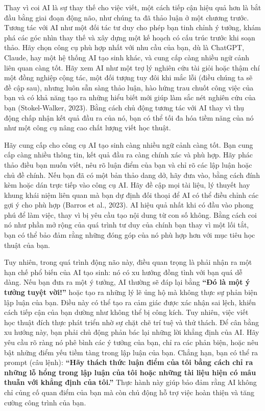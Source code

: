 Thay vì coi AI là sự thay thế cho việc viết, một cách tiếp cận hiệu quả hơn là bắt đầu bằng giai đoạn động não, như chúng ta đã thảo luận ở một chương trước. Tương tác với AI như một đối tác tư duy cho phép bạn tinh chỉnh ý tưởng, khám phá các góc nhìn thay thế và xây dựng một kế hoạch có cấu trúc trước khi soạn thảo. Hãy chọn công cụ phù hợp nhất với nhu cầu của bạn, dù là ChatGPT, Claude, hay một hệ thống AI tạo sinh khác, và cung cấp càng nhiều ngữ cảnh liên quan càng tốt. Hãy xem AI như một trợ lý nghiên cứu tài giỏi hoặc thậm chí một đồng nghiệp cộng tác, một đối tượng tuy đôi khi mắc lỗi (điều chúng ta sẽ đề cập sau), nhưng luôn sẵn sàng thảo luận, hào hứng trau chuốt công việc của bạn và có khả năng tạo ra những hiểu biết mới giúp làm sắc nét nghiên cứu của bạn (Stokel-Walker, 2023). Bằng cách chủ động tương tác với AI thay vì thụ động chấp nhận kết quả đầu ra của nó, bạn có thể tối đa hóa tiềm năng của nó như một công cụ nâng cao chất lượng viết học thuật.

Hãy cung cấp cho công cụ AI tạo sinh càng nhiều ngữ cảnh càng tốt. Bạn cung cấp càng nhiều thông tin, kết quả đầu ra càng chính xác và phù hợp. Hãy phác thảo điều bạn muốn viết, nêu rõ luận điểm của bạn và chỉ rõ các lập luận hoặc chủ đề chính. Nếu bạn đã có một bản thảo dang dở, hãy đưa vào, bằng cách đính kèm hoặc dán trực tiếp vào công cụ AI. Hãy đề cập mọi tài liệu, lý thuyết hay khung khái niệm liên quan mà bạn dự định đối thoại để AI có thể điều chỉnh các gợi ý cho phù hợp (Barros et al., 2023). AI hiệu quả nhất khi có đầu vào phong phú để làm việc, thay vì bị yêu cầu tạo nội dung từ con số không. Bằng cách coi nó như phần mở rộng của quá trình tư duy của chính bạn thay vì một lối tắt, bạn có thể bảo đảm rằng những đóng góp của nó phù hợp hơn với mục tiêu học thuật của bạn.

Tuy nhiên, trong quá trình động não này, điều quan trọng là phải nhận ra một hạn chế phổ biến của AI tạo sinh: nó có xu hướng đồng tình với bạn quá dễ dàng. Nếu bạn đưa ra một ý tưởng, AI thường sẽ đáp lại bằng \textbf{``Đó là một ý tưởng tuyệt vời!''} hoặc tạo ra những lý lẽ ủng hộ mà không thực sự phản biện lập luận của bạn. Điều này có thể tạo ra cảm giác được xác nhận sai lệch, khiến cách tiếp cận của bạn dường như không thể bị công kích. Tuy nhiên, việc viết học thuật đích thực phát triển nhờ sự chặt chẽ trí tuệ và thử thách. Để cân bằng xu hướng này, bạn phải chủ động phản bác lại những lời khẳng định của AI. Hãy yêu cầu rõ ràng nó phê bình các ý tưởng của bạn, chỉ ra các phản biện, hoặc nêu bật những điểm yếu tiềm tàng trong lập luận của bạn. Chẳng hạn, bạn có thể ra prompt (câu lệnh): \textbf{``Hãy thách thức luận điểm của tôi bằng cách chỉ ra những lỗ hổng trong lập luận của tôi hoặc những tài liệu hiện có mâu thuẫn với khẳng định của tôi.''} Thực hành này giúp bảo đảm rằng AI không chỉ củng cố quan điểm của bạn mà còn chủ động hỗ trợ việc hoàn thiện và tăng cường công trình của bạn.

